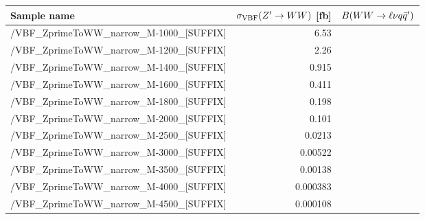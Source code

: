 \scriptsize
\begin{tabular}{lrr}
  \hline
  \textbf{Sample name} & $\sigma_{\mathrm{VBF}}(Z'\to WW)$ [fb] & $B(WW\to\ell\nu q\bar{q}')$ \\
  \hline
  \ttfamily /VBF\_ZprimeToWW\_narrow\_M-1000\_[SUFFIX] & 6.53  \\
  \ttfamily /VBF\_ZprimeToWW\_narrow\_M-1200\_[SUFFIX] & 2.26  \\
  \ttfamily /VBF\_ZprimeToWW\_narrow\_M-1400\_[SUFFIX] & 0.915  \\
  \ttfamily /VBF\_ZprimeToWW\_narrow\_M-1600\_[SUFFIX] & 0.411  \\
  \ttfamily /VBF\_ZprimeToWW\_narrow\_M-1800\_[SUFFIX] & 0.198  \\
  \ttfamily /VBF\_ZprimeToWW\_narrow\_M-2000\_[SUFFIX] & 0.101  \\
  \ttfamily /VBF\_ZprimeToWW\_narrow\_M-2500\_[SUFFIX] & 0.0213  \\
  \ttfamily /VBF\_ZprimeToWW\_narrow\_M-3000\_[SUFFIX] & 0.00522  \\
  \ttfamily /VBF\_ZprimeToWW\_narrow\_M-3500\_[SUFFIX] & 0.00138  \\
  \ttfamily /VBF\_ZprimeToWW\_narrow\_M-4000\_[SUFFIX] & 0.000383  \\
  \ttfamily /VBF\_ZprimeToWW\_narrow\_M-4500\_[SUFFIX] & 0.000108  \\
  \hline
\end{tabular}
